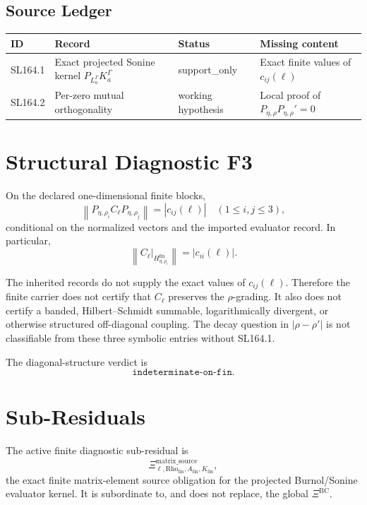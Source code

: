 \documentclass[11pt]{article}
\newcommand{\Rfin}{\mathrm{Rho}_{\mathrm{fin}}}
\newcommand{\Afin}{A_{\mathrm{fin}}}
\newcommand{\Kfin}{K_{\mathrm{fin}}}
\newcommand{\Petarho}{P_{\eta,\rho}}
\newcommand{\Cell}{C_{\ell}}
\begin{document}
\subsection*{Source Ledger}

\begin{center}
\begin{tabular}{@{}llll@{}}
\toprule
ID & Record & Status & Missing content\\
\midrule
SL164.1 &
Exact projected Sonine kernel \(P_{L_a^\Gamma}K_a^\Gamma\) &
support\_only &
Exact finite values of \(c_{ij}(\ell)\)\\
SL164.2 &
Per-zero mutual orthogonality &
working hypothesis &
Local proof of \(\Petarho\Petarho'=0\)\\
\bottomrule
\end{tabular}
\end{center}

\section*{Structural Diagnostic F3}

On the declared one-dimensional finite blocks,
\[
  \left\|P_{\eta,\rho_i}\Cell P_{\eta,\rho_j}\right\|
  =
  |c_{ij}(\ell)|
  \quad (1\leq i,j\leq3),
\]
conditional on the normalized vectors and the imported evaluator record.
In particular,
\[
  \left\|\Cell|_{H_{\eta,\rho_i}^{\mathrm{fin}}}\right\|
  =
  |c_{ii}(\ell)|.
\]

The inherited records do not supply the exact values of \(c_{ij}(\ell)\).
Therefore the finite carrier does not certify that \(\Cell\) preserves the
\(\rho\)-grading. It also does not certify a banded, Hilbert--Schmidt
summable, logarithmically divergent, or otherwise structured off-diagonal
coupling. The decay question in \(|\rho-\rho'|\) is not classifiable from
these three symbolic entries without SL164.1.

The diagonal-structure verdict is
\[
  \boxed{\texttt{indeterminate-on-fin}.}
\]

\section*{Sub-Residuals}

The active finite diagnostic sub-residual is
\[
  \Xi^{\mathrm{matrix\_source}}_{\ell,\Rfin,\Afin,\Kfin},
\]
the exact finite matrix-element source obligation for the projected
Burnol/Sonine evaluator kernel. It is subordinate to, and does not replace,
the global \(\Xi^{\mathrm{BC}}\).
\end{document}
